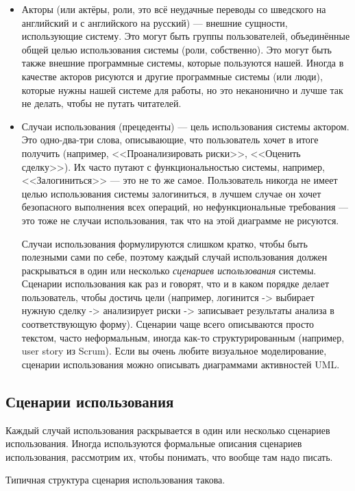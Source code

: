 \documentclass{../../text-style}
\begin{document}
\begin{itemize}
    \item Акторы (или актёры, роли, это всё неудачные переводы со шведского на английский и с английского на русский) --- внешние сущности, использующие систему. Это могут быть группы пользователей, объединённые общей целью использования системы (роли, собственно). Это могут быть также внешние программные системы, которые пользуются нашей. Иногда в качестве акторов рисуются и другие программные системы (или люди), которые нужны нашей системе для работы, но это неканонично и лучше так не делать, чтобы не путать читателей.
    \item Случаи использования (прецеденты)  --- цель использования системы актором. Это одно-два-три слова, описывающие, что пользователь хочет в итоге получить (например, <<Проанализировать риски>>, <<Оценить сделку>>). Их часто путают с функциональностью системы, например, <<Залогиниться>> --- это не то же самое. Пользователь никогда не имеет целью использования системы залогиниться, в лучшем случае он хочет безопасного выполнения всех операций, но нефункциональные требования --- это тоже не случаи использования, так что на этой диаграмме не рисуются.

    Случаи использования формулируются слишком кратко, чтобы быть полезными сами по себе, поэтому каждый случай использования должен раскрываться в один или несколько \textit{сценариев использования} системы. Сценарии использования как раз и говорят, что и в каком порядке делает пользователь, чтобы достичь цели (например, логинится -> выбирает нужную сделку -> анализирует риски -> записывает результаты анализа в соответствующую форму). Сценарии чаще всего описываются просто текстом, часто неформальным, иногда как-то структурированным (например, user story из Scrum). Если вы очень любите визуальное моделирование, сценарии использования можно описывать диаграммами активностей UML.
\end{itemize}

\subsection{Сценарии использования}

Каждый случай использования раскрывается в один или несколько сценариев использования. Иногда используются формальные описания сценариев использования, рассмотрим их, чтобы понимать, что вообще там надо писать.

Типичная структура сценария использования такова.
\end{document}
